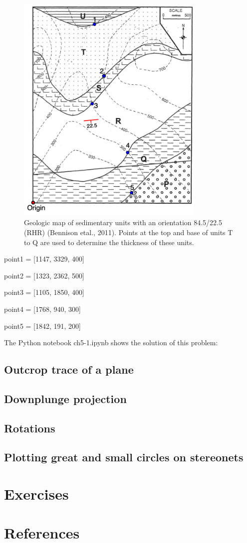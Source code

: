 \documentclass[a4paper , 12pt]{book}
\begin{document}
 \begin{figure}[H]
    \centering
    \includegraphics[width=9cm]{Figures/ch5f4.png}
    \caption{Geologic map of sedimentary units with an orientation 84.5/22.5 (RHR) (Bennison etal.,  2011). Points at the top and base of units T to Q are used to determine the thickness of these units.}
\end{figure}

point1 = [1147, 3329, 400]

point2 = [1323, 2362, 500]

point3 = [1105, 1850, 400]

point4 = [1768, 940, 300]

point5 = [1842, 191, 200]

The Python notebook ch5-1.ipynb shows the solution of this problem:






\subsection{Outcrop trace of a plane}

\subsection{Downplunge projection}

\subsection{Rotations}

\subsection{Plotting great and small circles on stereonets}

\section{Exercises}

\section*{References}
\end{document}
